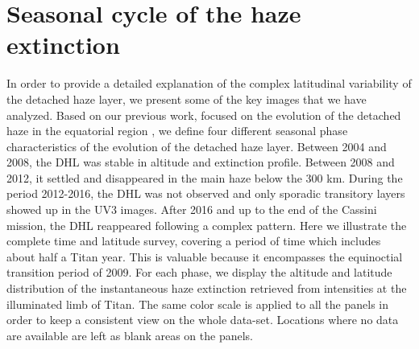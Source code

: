 \section{Seasonal cycle of the haze extinction}

In order to provide a detailed explanation of the complex latitudinal variability of the detached haze layer, we present
some of the key images that we have analyzed. Based on our previous work, focused on the evolution of the detached haze in the
equatorial region \citep{West2018}, we define four different seasonal phase characteristics of the evolution of the detached haze layer.
Between 2004 and 2008, the DHL was stable in altitude and extinction profile.
Between 2008 and 2012, it settled and disappeared in the main haze below the 300 km.
During the period 2012-2016, the DHL was not observed and only sporadic transitory layers showed up in the UV3 images.
After 2016 and up to the end of the Cassini mission, the DHL reappeared following a complex pattern.
Here we illustrate the complete time and latitude survey, covering a period of time which includes about half a Titan year.
This is valuable because it encompasses the equinoctial transition period of 2009.
For each phase, we display the altitude and latitude distribution of the instantaneous haze extinction retrieved from intensities at the illuminated limb of Titan.
The same color scale is applied to all the panels in order to keep a consistent view on the whole data-set.
Locations where no data are available are left as blank areas on the panels.




